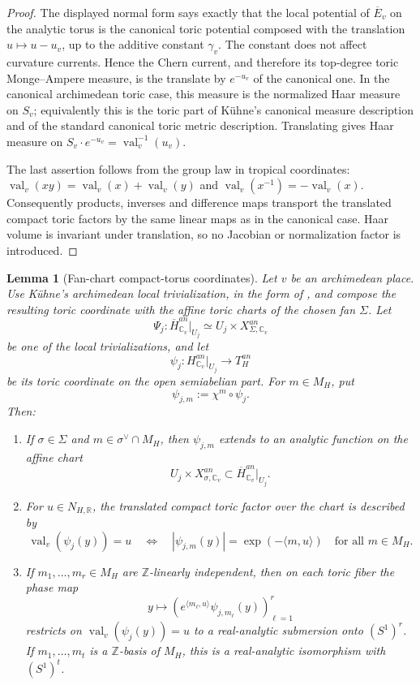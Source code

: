 \documentclass[10pt,a4paper]{amsart}
\theoremstyle{plain}
\newtheorem{lemma}[theorem]{Lemma}
\DeclareMathOperator{\val}{val}
\theoremstyle{plain}
\numberwithin{equation}{section}
\providecommand{\bE}{\overline{E}}
\begin{document}
\begin{proof}
	The displayed normal form says exactly that the local potential of \(\bE_v\)
	on the analytic torus is the canonical toric potential composed with the
	translation \(u\mapsto u-u_v\), up to the additive constant \(\gamma_v\).  The
	constant does not affect curvature currents.  Hence the Chern current, and
	therefore its top-degree toric Monge--Ampere measure, is the translate by
	\(e^{-u_v}\) of the canonical one.  In the canonical archimedean toric case,
	this measure is the normalized Haar measure on \(S_v\); equivalently this is
	the toric part of K\"uhne's canonical measure description and of the standard
	canonical toric metric description.  Translating gives Haar measure on
	\(S_v\cdot e^{-u_v}=\val_v^{-1}(u_v)\).
	
	The last assertion follows from the group law in tropical coordinates:
	\(\val_v(xy)=\val_v(x)+\val_v(y)\) and
	\(\val_v(x^{-1})=-\val_v(x)\).  Consequently products, inverses and difference
	maps transport the translated compact toric factors by the same linear maps as
	in the canonical case.  Haar volume is invariant under translation, so no
	Jacobian or normalization factor is introduced.
\end{proof}

\begin{lemma}[Fan-chart compact-torus coordinates]
	\label{lem:fan-chart-compact-torus-coordinates}
	Let \(v\) be an archimedean place.  Use K\"uhne's archimedean local
	trivialization, in the form of \cite[Section~3.5, Lemma~3.3]{Ku1}, and compose
	the resulting toric coordinate with the affine toric charts of the chosen fan
	\(\Sigma\).  Let
	\[
	\Psi_j:\overline H^{an}_{\mathbb C_v}|_{U_j}
	\simeq
	U_j\times X_{\Sigma,\mathbb C_v}^{an}
	\]
	be one of the local trivializations, and let
	\[
	\psi_j:H^{an}_{\mathbb C_v}|_{U_j}\longrightarrow T_H^{an}
	\]
	be its toric coordinate on the open semiabelian part.  For \(m\in M_H\), put
	\[
	\psi_{j,m}:=\chi^m\circ\psi_j .
	\]
	Then:
	\begin{enumerate}[label=\textup{(\alph*)},leftmargin=2em]
		\item If \(\sigma\in\Sigma\) and \(m\in\sigma^\vee\cap M_H\), then
		\(\psi_{j,m}\) extends to an analytic function on the affine chart
		\[
		U_j\times X_{\sigma,\mathbb C_v}^{an}
		\subset
		\overline H^{an}_{\mathbb C_v}|_{U_j}.
		\]
		\item For \(u\in N_{H,\mathbb R}\), the translated compact toric factor over
		the chart is described by
		\[
		\val_v(\psi_j(y))=u
		\quad\Longleftrightarrow\quad
		|\psi_{j,m}(y)|=\exp(-\langle m,u\rangle)
		\quad\text{for all }m\in M_H .
		\]
		\item If \(m_1,\ldots,m_r\in M_H\) are \(\mathbb Z\)-linearly independent, then
		on each toric fiber the phase map
		\[
		y\longmapsto
		\left(e^{\langle m_\ell,u\rangle}\psi_{j,m_\ell}(y)\right)_{\ell=1}^r
		\]
		restricts on \(\val_v(\psi_j(y))=u\) to a real-analytic submersion onto
		\((S^1)^r\).  If \(m_1,\ldots,m_t\) is a \(\mathbb Z\)-basis of \(M_H\), this is
		a real-analytic isomorphism with \((S^1)^t\).
	\end{enumerate}
\end{lemma}
\end{document}
